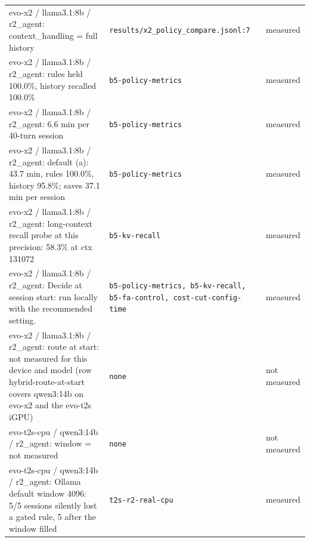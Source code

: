 \begin{longtable}{>{\raggedright\arraybackslash}p{}>{\raggedright\arraybackslash}p{}>{\raggedright\arraybackslash}p{}}
\small evo-x2 / llama3.1:8b / r2\_agent: context\_handling = full history & {\footnotesize \texttt{results/\allowbreak{}x2\_\allowbreak{}policy\_\allowbreak{}compare.\allowbreak{}jsonl:\allowbreak{}7}} & \small measured \\

\small evo-x2 / llama3.1:8b / r2\_agent: rules held 100.0\%, history recalled 100.0\% & {\footnotesize \texttt{b5-\allowbreak{}policy-\allowbreak{}metrics}} & \small measured \\

\small evo-x2 / llama3.1:8b / r2\_agent: 6.6 min per 40-turn session & {\footnotesize \texttt{b5-\allowbreak{}policy-\allowbreak{}metrics}} & \small measured \\

\small evo-x2 / llama3.1:8b / r2\_agent: default (a): 43.7 min, rules 100.0\%, history 95.8\%; saves 37.1 min per session & {\footnotesize \texttt{b5-\allowbreak{}policy-\allowbreak{}metrics}} & \small measured \\

\small evo-x2 / llama3.1:8b / r2\_agent: long-context recall probe at this precision: 58.3\% at ctx 131072 & {\footnotesize \texttt{b5-\allowbreak{}kv-\allowbreak{}recall}} & \small measured \\

\small evo-x2 / llama3.1:8b / r2\_agent: Decide at session start: run locally with the recommended setting. & {\footnotesize \texttt{b5-\allowbreak{}policy-\allowbreak{}metrics, b5-\allowbreak{}kv-\allowbreak{}recall, b5-\allowbreak{}fa-\allowbreak{}control, cost-\allowbreak{}cut-\allowbreak{}config-\allowbreak{}time}} & \small measured \\

\small evo-x2 / llama3.1:8b / r2\_agent: route at start: not measured for this device and model (row hybrid-route-at-start covers qwen3:14b on evo-x2 and the evo-t2s iGPU) & {\footnotesize \texttt{none}} & \small not measured \\

\small evo-t2s-cpu / qwen3:14b / r2\_agent: window = not measured & {\footnotesize \texttt{none}} & \small not measured \\

\small evo-t2s-cpu / qwen3:14b / r2\_agent: Ollama default window 4096: 5/5 sessions silently lost a gated rule, 5 after the window filled & {\footnotesize \texttt{t2s-\allowbreak{}r2-\allowbreak{}real-\allowbreak{}cpu}} & \small measured \\


\end{longtable}
